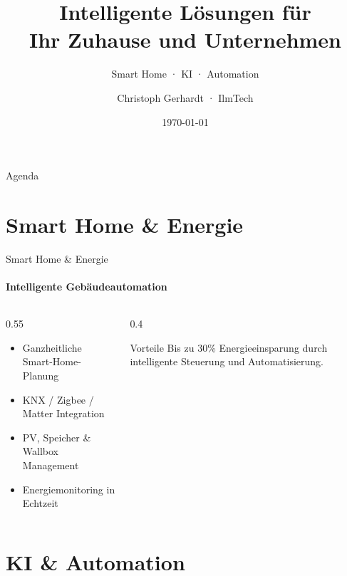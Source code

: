 \documentclass[aspectratio=169]{beamer}
\title{Intelligente Lösungen für\\Ihr Zuhause und Unternehmen}
\subtitle{Smart Home · KI · Automation}
\author{Christoph Gerhardt · IlmTech}
\date{\today}
\begin{document}
\begin{frame}[plain]
  \titlepage
\end{frame}

\begin{frame}{Agenda}
  \tableofcontents
\end{frame}

\section{Smart Home \& Energie}

\begin{frame}{Smart Home \& Energie}
  \framesubtitle{Intelligente Gebäudeautomation}

  \begin{columns}[T]
    \begin{column}{0.55\textwidth}
      \begin{itemize}
        \item Ganzheitliche Smart-Home-Planung
        \item KNX / Zigbee / Matter Integration
        \item PV, Speicher \& Wallbox Management
        \item Energiemonitoring in Echtzeit
      \end{itemize}
    \end{column}
    \begin{column}{0.4\textwidth}
      \begin{block}{Vorteile}
        Bis zu \alert{30\%} Energieeinsparung durch intelligente Steuerung und Automatisierung.
      \end{block}
    \end{column}
  \end{columns}
\end{frame}

\section{KI \& Automation}
\end{document}
